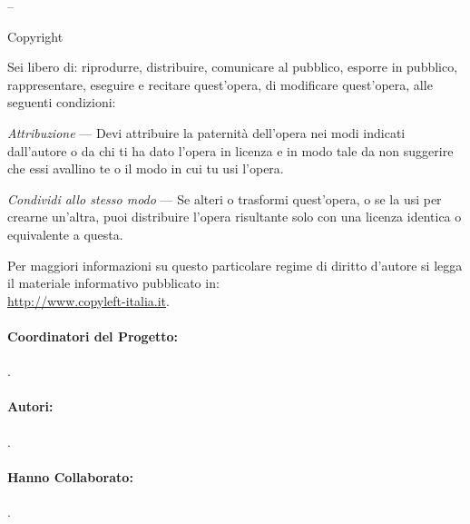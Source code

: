 
\thispagestyle{empty}
{\setlength{\parindent}{0em}\small{
\begin{center}
{\large{\serie – \titolo}}

Copyright {\textcopyright} {\anno} \editore
\end{center}


Sei libero di:
riprodurre, distribuire, comunicare al pubblico, esporre in pubblico, 
rappresentare, eseguire e recitare quest'opera, di modificare quest'opera, 
alle seguenti condizioni:

\emph{Attribuzione} --- Devi attribuire la paternità dell'opera nei modi 
indicati dall'autore o da chi ti ha dato l'opera in licenza e in modo tale 
da non suggerire che essi avallino te o il modo in cui tu usi l'opera.

\emph{Condividi allo stesso modo} --- Se alteri o trasformi quest'opera, 
o se la usi per crearne un'altra, puoi distribuire l'opera risultante solo 
con una licenza identica o equivalente a questa.

Per maggiori informazioni su questo particolare regime di diritto d'autore 
si legga il materiale informativo pubblicato in:\\
\url{http://www.copyleft-italia.it}.

\paragraph{Coordinatori del Progetto:} \coord.

\paragraph{Autori:} \autori.

\paragraph{Hanno Collaborato:} \colab.

}}
